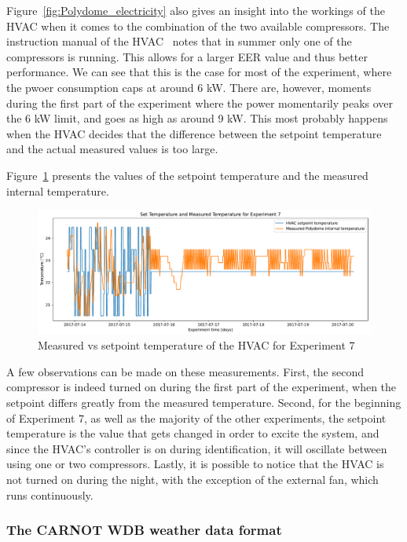 Figure~\ref{fig:Polydome_electricity} also gives an insight into the workings of
the HVAC when it comes to the combination of the two available compressors. The
instruction manual of the HVAC~\cite{aermecRoofTopManuelSelection} notes that in
summer only one of the compressors is running. This allows for a larger EER
value and thus better performance. We can see that this is the case for most of
the experiment, where the pwoer consumption caps at around 6 kW. There are,
however, moments during the first part of the experiment where the power
momentarily peaks over the 6 kW limit, and goes as high as around 9 kW. This
most probably happens when the HVAC decides that the difference between the
setpoint temperature and the actual measured values is too large.

Figure~\ref{fig:Polydome_exp7_settemp} presents the values of the setpoint
temperature and the measured internal temperature. 

\begin{figure}[ht]
    \centering
    \includegraphics[width = \textwidth]{Plots/Exp_settemp.pdf}
    \caption{Measured vs setpoint temperature of the HVAC for Experiment 7}
    \label{fig:Polydome_exp7_settemp}
\end{figure}

A few observations can be made on these measurements. First, the second
compressor is indeed turned on during the first part of the experiment, when the
setpoint differs greatly from the measured temperature. Second, for the
beginning of Experiment 7, as well as the majority of the other experiments, the
setpoint temperature is the value that gets changed in order to excite the
system, and since the HVAC's controller is on during identification, it will
oscillate between using one or two compressors. Lastly, it is possible to notice
that the HVAC is not turned on during the night, with the exception of the
external fan, which runs continuously.

\subsubsection{The CARNOT WDB weather data format}\label{sec:CARNOT_WDB}

